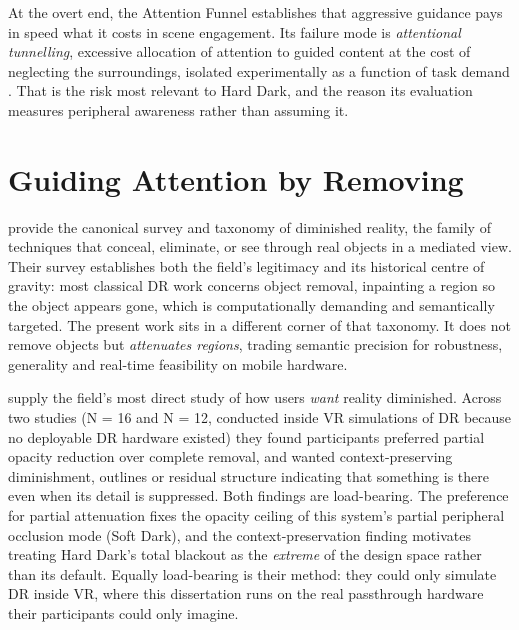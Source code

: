 At the overt end, the Attention Funnel \citep{biocca2006} establishes that aggressive guidance
pays in speed what it costs in scene engagement. Its failure mode is \textit{attentional
tunnelling}, excessive allocation of attention to guided content at the cost of neglecting the
surroundings, isolated experimentally as a function of task demand \citep{syiem2021}. That is the
risk most relevant to Hard Dark, and the reason its evaluation measures peripheral awareness rather
than assuming it.

\section{Guiding Attention by Removing}

\citet{mori2017} provide the canonical survey and taxonomy of diminished reality, the family of
techniques that conceal, eliminate, or see through real objects in a mediated view. Their survey
establishes both the field's legitimacy and its historical centre of gravity: most classical DR work
concerns object removal, inpainting a region so the object appears gone, which is computationally
demanding and semantically targeted. The present work sits in a different corner of that taxonomy. It
does not remove objects but \textit{attenuates regions}, trading semantic precision for robustness,
generality and real-time feasibility on mobile hardware.

\citet{cheng2022} supply the field's most direct study of how users \textit{want} reality diminished.
Across two studies (N = 16 and N = 12, conducted inside VR simulations of DR because no deployable DR
hardware existed) they found participants preferred partial opacity reduction over complete removal,
and wanted context-preserving diminishment, outlines or residual structure indicating that something
is there even when its detail is suppressed. Both findings are load-bearing. The preference for partial attenuation fixes the opacity ceiling of
this system's partial peripheral occlusion mode (Soft Dark), and the context-preservation finding
motivates treating Hard Dark's total blackout as the \textit{extreme} of the design space rather
than its default. Equally load-bearing is their method: they could only simulate DR inside VR, where this
dissertation runs on the real passthrough hardware their participants could only imagine.

